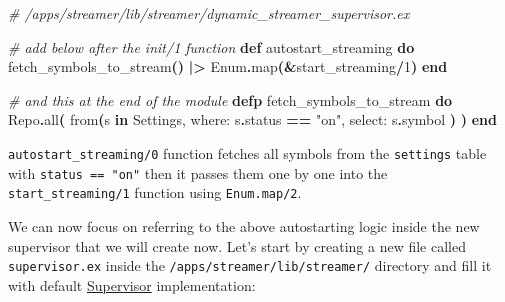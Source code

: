 \documentclass[
  oneside]{book}
\newenvironment{Shaded}{\begin{snugshade}}{\end{snugshade}}
\newcommand{\CommentTok}[1]{\textcolor[rgb]{0.56,0.35,0.01}{\textit{#1}}}
\newcommand{\ConstantTok}[1]{\textcolor[rgb]{0.56,0.35,0.01}{#1}}
\newcommand{\DecValTok}[1]{\textcolor[rgb]{0.00,0.00,0.81}{#1}}
\newcommand{\FunctionTok}[1]{\textcolor[rgb]{0.13,0.29,0.53}{\textbf{#1}}}
\newcommand{\KeywordTok}[1]{\textcolor[rgb]{0.13,0.29,0.53}{\textbf{#1}}}
\newcommand{\NormalTok}[1]{#1}
\newcommand{\OperatorTok}[1]{\textcolor[rgb]{0.81,0.36,0.00}{\textbf{#1}}}
\newcommand{\StringTok}[1]{\textcolor[rgb]{0.31,0.60,0.02}{#1}}
\newcommand{\VariableTok}[1]{\textcolor[rgb]{0.00,0.00,0.00}{#1}}
\begin{document}
\begin{Shaded}
\begin{Highlighting}[]
  \CommentTok{\# /apps/streamer/lib/streamer/dynamic\_streamer\_supervisor.ex}

  \CommentTok{\# add below after the \textasciigrave{}init/1\textasciigrave{} function}
  \KeywordTok{def}\NormalTok{ autostart\_streaming }\KeywordTok{do}
\NormalTok{    fetch\_symbols\_to\_stream}\FunctionTok{()}
    \OperatorTok{|\textgreater{}} \ConstantTok{Enum}\OperatorTok{.}\NormalTok{map}\FunctionTok{(}\OperatorTok{\&}\NormalTok{start\_streaming}\OperatorTok{/}\DecValTok{1}\FunctionTok{)}
  \KeywordTok{end}

  \CommentTok{\# and this at the end of the module}
  \KeywordTok{defp}\NormalTok{ fetch\_symbols\_to\_stream }\KeywordTok{do}
    \ConstantTok{Repo}\OperatorTok{.}\NormalTok{all}\FunctionTok{(}
\NormalTok{      from}\FunctionTok{(}\NormalTok{s }\KeywordTok{in} \ConstantTok{Settings}\NormalTok{,}
        \VariableTok{where:}\NormalTok{ s}\OperatorTok{.}\NormalTok{status }\OperatorTok{==} \StringTok{"on"}\NormalTok{,}
        \VariableTok{select:}\NormalTok{ s}\OperatorTok{.}\NormalTok{symbol}
      \FunctionTok{)}
    \FunctionTok{)}
  \KeywordTok{end}
\end{Highlighting}
\end{Shaded}

\texttt{autostart\_streaming/0} function fetches all symbols from the \texttt{settings} table with \texttt{status\ ==\ "on"} then it passes them one by one into the \texttt{start\_streaming/1} function using \texttt{Enum.map/2}.

We can now focus on referring to the above autostarting logic inside the new supervisor that we will create now. Let's start by creating a new file called \texttt{supervisor.ex} inside the \texttt{/apps/streamer/lib/streamer/} directory and fill it with default \href{https://hexdocs.pm/elixir/master/Supervisor.html\#module-module-based-supervisors}{Supervisor} implementation:
\end{document}
